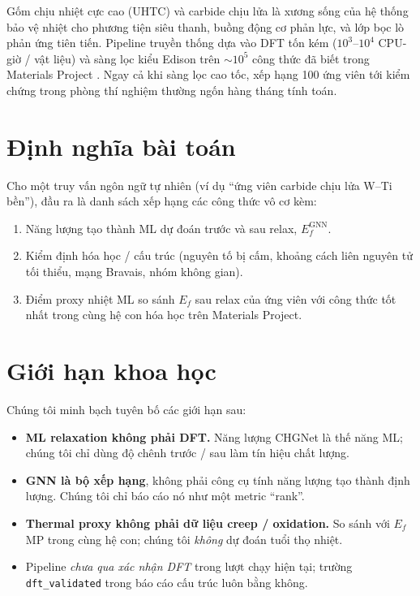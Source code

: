 \documentclass[11pt,a4paper]{report}
\begin{document}
Gốm chịu nhiệt cực cao (UHTC) và carbide chịu lửa là xương sống của hệ thống bảo vệ nhiệt
cho phương tiện siêu thanh, buồng động cơ phản lực, và lớp bọc lò phản ứng tiên tiến.
Pipeline truyền thống dựa vào DFT tốn kém ($10^3$--$10^4$ CPU-giờ / vật liệu) và sàng lọc
kiểu Edison trên $\sim$$10^5$ công thức đã biết trong Materials Project \cite{jain2013mp}.
Ngay cả khi sàng lọc cao tốc, xếp hạng 100 ứng viên tới kiểm chứng trong phòng thí nghiệm
thường ngốn hàng tháng tính toán.

\section{Định nghĩa bài toán}

Cho một truy vấn ngôn ngữ tự nhiên (ví dụ ``ứng viên carbide chịu lửa W--Ti bền''), đầu ra
là danh sách xếp hạng các công thức vô cơ kèm:
\begin{enumerate}[leftmargin=*,itemsep=2pt]
\item Năng lượng tạo thành ML dự đoán trước và sau relax, $E_f^{\text{GNN}}$.
\item Kiểm định hóa học / cấu trúc (nguyên tố bị cấm, khoảng cách liên nguyên tử tối thiểu,
      mạng Bravais, nhóm không gian).
\item Điểm proxy nhiệt ML so sánh $E_f$ sau relax của ứng viên với công thức tốt nhất
      trong cùng hệ con hóa học trên Materials Project.
\end{enumerate}

\section{Giới hạn khoa học}

Chúng tôi minh bạch tuyên bố các giới hạn sau:
\begin{itemize}[leftmargin=*,itemsep=2pt]
\item \textbf{ML relaxation không phải DFT.} Năng lượng CHGNet là thế năng ML; chúng tôi chỉ
      dùng độ chênh trước / sau làm tín hiệu chất lượng.
\item \textbf{GNN là bộ xếp hạng}, không phải công cụ tính năng lượng tạo thành định lượng.
      Chúng tôi chỉ báo cáo nó như một metric ``rank''.
\item \textbf{Thermal proxy không phải dữ liệu creep / oxidation.} So sánh với $E_f$ MP
      trong cùng hệ con; chúng tôi \emph{không} dự đoán tuổi thọ nhiệt.
\item Pipeline \emph{chưa qua xác nhận DFT} trong lượt chạy hiện tại; trường
      \texttt{dft\_validated} trong báo cáo cấu trúc luôn bằng không.
\end{itemize}
\end{document}
